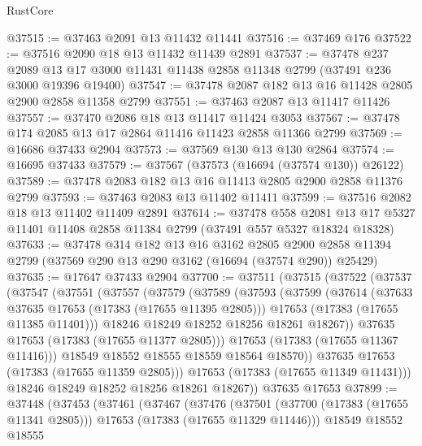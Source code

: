\begin{lexlean}{RustCore}
\begin{coremodule}
@37515 := @37463 @2091 @13 @11432 @11441
@37516 := @37469 @176
@37522 := @37516 @2090 @18 @13 @11432 @11439 @2891
@37537 := @37478
    @237
    @2089
    @13
    @17
    @3000
    @11431
    @11438
    @2858
    @11348
    @2799
    (@37491 @236 @3000 @19396 @19400)
@37547 := @37478 @2087 @182 @13 @16 @11428 @2805 @2900 @2858 @11358 @2799
@37551 := @37463 @2087 @13 @11417 @11426
@37557 := @37470 @2086 @18 @13 @11417 @11424 @3053
@37567 := @37478 @174 @2085 @13 @17 @2864 @11416 @11423 @2858 @11366 @2799
@37569 := @16686 @37433 @2904
@37573 := @37569 @130 @13 @130 @2864
@37574 := @16695 @37433
@37579 := @37567 (@37573 (@16694 (@37574 @130)) @26122)
@37589 := @37478 @2083 @182 @13 @16 @11413 @2805 @2900 @2858 @11376 @2799
@37593 := @37463 @2083 @13 @11402 @11411
@37599 := @37516 @2082 @18 @13 @11402 @11409 @2891
@37614 := @37478
    @558
    @2081
    @13
    @17
    @5327
    @11401
    @11408
    @2858
    @11384
    @2799
    (@37491 @557 @5327 @18324 @18328)
@37633 := @37478
    @314
    @182
    @13
    @16
    @3162
    @2805
    @2900
    @2858
    @11394
    @2799
    (@37569 @290 @13 @290 @3162 (@16694 (@37574 @290)) @25429)
@37635 := @17647 @37433 @2904
@37700 := @37511
    (@37515
      (@37522
        (@37537
          (@37547
            (@37551
              (@37557
                (@37579
                  (@37589
                    (@37593
                      (@37599
                        (@37614
                          (@37633 @37635 @17653 (@17383 (@17655 @11395 @2805)))
                          @17653
                          (@17383 (@17655 @11385 @11401)))
                        @18246
                        @18249
                        @18252
                        @18256
                        @18261
                        @18267))
                    @37635
                    @17653
                    (@17383 (@17655 @11377 @2805)))
                  @17653
                  (@17383 (@17655 @11367 @11416)))
                @18549
                @18552
                @18555
                @18559
                @18564
                @18570))
            @37635
            @17653
            (@17383 (@17655 @11359 @2805)))
          @17653
          (@17383 (@17655 @11349 @11431)))
        @18246
        @18249
        @18252
        @18256
        @18261
        @18267))
    @37635
    @17653
@37899 := @37448
    (@37453
      (@37461
        (@37467
          (@37476
            (@37501 (@37700 (@17383 (@17655 @11341 @2805))) @17653 (@17383 (@17655 @11329 @11446)))
            @18549
            @18552
            @18555

\end{coremodule}
\end{lexlean}
